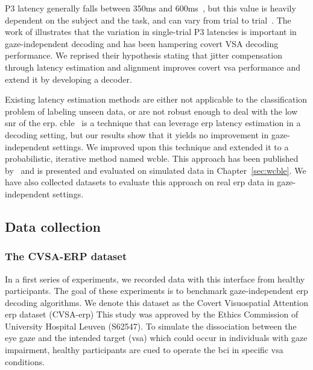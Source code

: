 P3 latency generally falls between 350ms and 600ms~\cite{Luck2014}, but this
value is heavily dependent on the subject and the task, and can vary from trial
to trial~\cite{Ouyang2017}.
The work of \cite{Arico2014} illustrates that the variation in single-trial P3
latencies is important in gaze-independent decoding and has been hampering covert
VSA decoding performance.
We reprised their hypothesis stating that jitter compensation through latency
estimation and alignment improves
covert \ac{vsa} performance and extend it by developing a decoder.

Existing latency estimation methods are either not applicable to the
classification problem of labeling unseen data, or are not robust enough to
deal with the low \ac{snr} of the \ac{erp}.
\Ac{cble}~\cite{Mowla2017} is a technique that can leverage
\ac{erp} latency estimation in a decoding setting, but our results show that it
yields no improvement in gaze-independent settings.
We improved upon this technique and extended it to a probabilistic, iterative
method named \ac{wcble}.
This approach has been published by~\cite{VanDenKerchove2024} and is presented
and evaluated on simulated data in Chapter~\ref{sec:wcble}.
We have also collected datasets to evaluate this approach on real \ac{erp} data
in gaze-independent settings.

\subsection{Data collection}

\subsubsection{The CVSA-ERP dataset}
\label{sec:gaze-independence/approach/cvsa-erp}

In a first series of experiments, we recorded data with this interface from healthy participants.
The goal of these experiments is to benchmark
gaze-independent \ac{erp} decoding algorithms.
We denote this dataset as the Covert Visuospatial Attention \ac{erp} dataset
(CVSA-\ac{erp})
This study was approved by the Ethics Commission of University Hospital Leuven
(S62547).
To simulate the dissociation between the eye gaze and the
intended target (\ac{vsa}) which could occur in individuals with gaze
impairment, healthy participants are cued to operate the \ac{bci} in specific
\ac{vsa} conditions.


